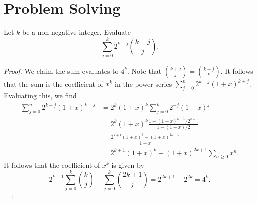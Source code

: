\documentclass[11pt]{article}
\renewcommand{\>}{\rangle}
\newcommand{\<}{\langle}
\begin{document}
\section{Problem Solving}
\begin{problem}[Putnam 2020 A2] Let $k$ be a non-negative integer.  Evaluate 
$$\sum_{j=0}^k 2^{k-j} \binom{k+j}{j}.$$
\begin{proof}
We claim the sum evaluates to $4^k$.  Note that $\binom{k+j}{j} = \binom{k+j}{k}$.  It follows that the sum is the coefficient of $x^k$ in the power series $\sum_{j=0}^n 2^{k-j} (1 + x)^{k + j}$.  Evaluating this, we find
\begin{align*}
\sum_{j=0}^n 2^{k-j} (1 + x)^{k + j} &= 2^{k}(1 + x)^{k} \sum_{j=0}^k 2^{-j} (1 + x)^j \\
&= 2^k (1 + x)^k \frac{1 - (1 + x)^{k+1}/2^{k+ 1}}{1 - (1 + x)/2} \\
&= \frac{2^{k + 1}(1 + x)^k - (1 + x)^{2k + 1}}{1 - x} \\
&= 2^{k + 1}(1 + x)^k - (1 + x)^{2k + 1} \sum_{n \ge 0} x^n.
\end{align*}
It follows that the coefficient of $x^k$ is given by 
$$2^{k +1} \sum_{j=0}^k \binom{k}{j} - \sum_{j=0}^k \binom{2k+1}{j} = 2^{2k+1} - 2^{2k} = 4^k.$$
\end{proof}
\end{problem}

 
\end{document}
